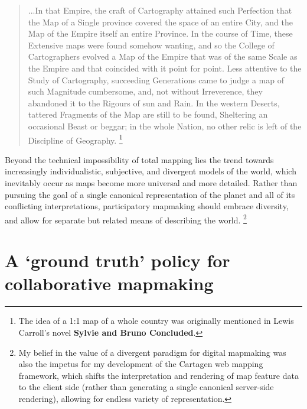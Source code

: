 \documentclass[11pt,oneside,notitlepage]{report}
\begin{document}
\begin{quote}
...In that Empire, the craft of Cartography attained such Perfection that the Map of a Single province covered the space of an entire City, and the Map of the Empire itself an entire Province. In the course of Time, these Extensive maps were found somehow wanting, and so the College of Cartographers evolved a Map of the Empire that was of the same Scale as the Empire and that coincided with it point for point. Less attentive to the Study of Cartography, succeeding Generations came to judge a map of such Magnitude cumbersome, and, not without Irreverence, they abandoned it to the Rigours of sun and Rain. In the western Deserts, tattered Fragments of the Map are still to be found, Sheltering an occasional Beast or beggar; in the whole Nation, no other relic is left of the Discipline of Geography.
\cite{borges1946exactitude} \footnote{The idea of a 1:1 map of a whole country was originally mentioned in Lewis Carroll's novel \textbf{Sylvie and Bruno Concluded}.} 
\end{quote}

Beyond the technical impossibility of total mapping lies the trend towards increasingly individualistic, subjective, and divergent models of the world, which inevitably occur as maps become more universal and more detailed. Rather than pursuing the goal of a single canonical representation of the planet and all of its conflicting interpretations, participatory mapmaking should embrace diversity, and allow for separate but related means of describing the world. \footnote{My belief in the value of a divergent paradigm for digital mapmaking was also the impetus for my development of the Cartagen web mapping framework, which shifts the interpretation and rendering of map feature data to the client side (rather than generating a single canonical server-side rendering), allowing for endless variety of representation.} 

\section{A `ground truth' policy for collaborative mapmaking}
\end{document}
